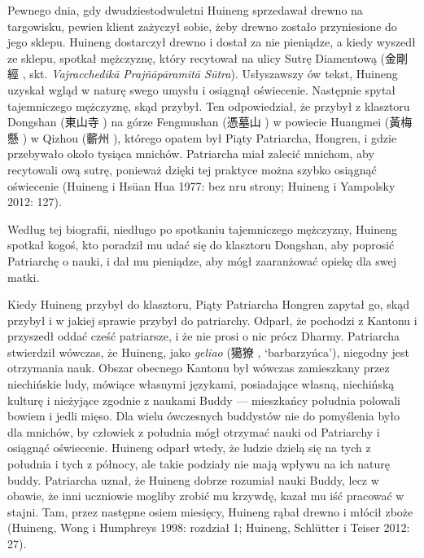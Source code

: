 Pewnego dnia, gdy dwudziestodwuletni Huineng sprzedawał drewno na targowisku, pewien klient zażyczył sobie, żeby drewno zostało przyniesione do jego sklepu. Huineng dostarczył drewno i dostał za nie pieniądze, a kiedy wyszedł ze sklepu, spotkał mężczyznę, który recytował na ulicy Sutrę Diamentową (金剛經 , skt. \textit{Vajracchedikā Prajñāpāramitā Sūtra}). Usłyszawszy ów tekst, Huineng uzyskał wgląd w naturę swego umysłu i osiągnął oświecenie. Następnie spytał tajemniczego mężczyznę, skąd przybył. Ten odpowiedział, że przybył z klasztoru Dongshan (東山寺 ) na górze Fengmushan (憑墓山 ) w powiecie Huangmei (黃梅懸 ) w Qizhou (蘄州 ), którego opatem był Piąty Patriarcha, Hongren, i gdzie przebywało około tysiąca mnichów. Patriarcha miał zalecić mnichom, aby recytowali ową sutrę, ponieważ dzięki tej praktyce można szybko osiągnąć oświecenie (Huineng i Hsüan Hua 1977: bez nru strony; Huineng i Yampolsky 2012: 127).

Według tej biografii, niedługo po spotkaniu tajemniczego mężczyzny, Huineng spotkał kogoś, kto poradził mu udać się do klasztoru Dongshan, aby poprosić Patriarchę o nauki, i dał mu pieniądze, aby mógł zaaranżować opiekę dla swej matki.

Kiedy Huineng przybył do klasztoru, Piąty Patriarcha Hongren zapytał go, skąd przybył i w jakiej sprawie przybył do patriarchy. Odparł, że pochodzi z Kantonu i przyszedł oddać cześć patriarsze, i że nie prosi o nic prócz Dharmy. Patriarcha stwierdził wówczas, że Huineng, jako \textit{geliao} (獦獠 , `barbarzyńca'), niegodny jest otrzymania nauk. Obszar obecnego Kantonu był wówczas zamieszkany przez niechińskie ludy, mówiące własnymi językami, posiadające własną, niechińską kulturę i nieżyjące zgodnie z naukami Buddy --- mieszkańcy południa polowali bowiem i jedli mięso. Dla wielu ówczesnych buddystów nie do pomyślenia było dla mnichów, by człowiek z południa mógł otrzymać nauki od Patriarchy i osiągnąć oświecenie. Huineng odparł wtedy, że ludzie dzielą się na tych z południa i tych z północy, ale takie podziały nie mają wpływu na ich naturę buddy. Patriarcha uznał, że Huineng dobrze rozumiał nauki Buddy, lecz w obawie, że inni uczniowie mogliby zrobić mu krzywdę, kazał mu iść pracować w stajni. Tam, przez następne osiem miesięcy, Huineng rąbał drewno i młócił zboże (Huineng, Wong i Humphreys 1998: rozdział 1; Huineng, Schlütter i Teiser 2012: 27).

